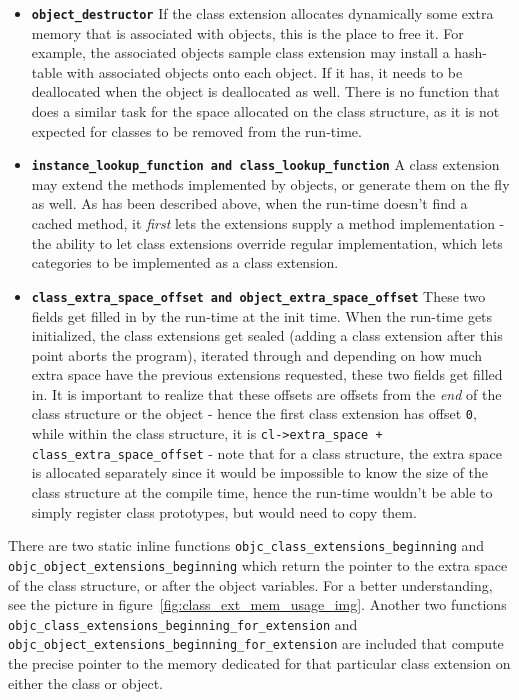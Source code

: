 \begin{itemize}
  \item{\bf{\tt{object\_destructor}}} If the class extension allocates dynamically some extra memory that is associated with objects, this is the place to free it. For example, the associated objects sample class extension may install a hash-table with associated objects onto each object. If it has, it needs to be deallocated when the object is deallocated as well.
  There is no function that does a similar task for the space allocated on the class structure, as it is not expected for classes to be removed from the run-time.
  \item{\bf{\tt{instance\_lookup\_function} and \tt{class\_lookup\_function}}} A class extension may extend the methods implemented by objects, or generate them on the fly as well. As has been described above, when the run-time doesn't find a cached method, it \emph{first} lets the extensions supply a method implementation - the ability to let class extensions override regular implementation, which lets categories to be implemented as a class extension.
  \item{\bf{\tt{class\_extra\_space\_offset} and \tt{object\_extra\_space\_offset}}} These two fields get filled in by the run-time at the init time. When the run-time gets initialized, the class extensions get sealed (adding a class extension after this point aborts the program), iterated through and depending on how much extra space have the previous extensions requested, these two fields get filled in. It is important to realize that these offsets are offsets from the \emph{end} of the class structure or the object - hence the first class extension has offset \texttt{0}, while within the class structure, it is \texttt{cl->extra\_space + class\_extra\_space\_offset} - note that for a class structure, the extra space is allocated separately since it would be impossible to know the size of the class structure at the compile time, hence the run-time wouldn't be able to simply register class prototypes, but would need to copy them. 
 
\end{itemize}

There are two static inline functions \texttt{objc\_class\_extensions\_beginning} \newline{}and \texttt{objc\_object\_extensions\_beginning} which return the pointer to the extra space of the class structure, or after the object variables. For a better understanding, see the picture in figure~\ref{fig:class_ext_mem_usage_img}. Another two functions \newline{}\texttt{objc\_class\_extensions\_beginning\_for\_extension} and \newline{}\texttt{objc\_object\_extensions\_beginning\_for\_extension} are included that compute the precise pointer to the memory dedicated for that particular class extension on either the class or object.


